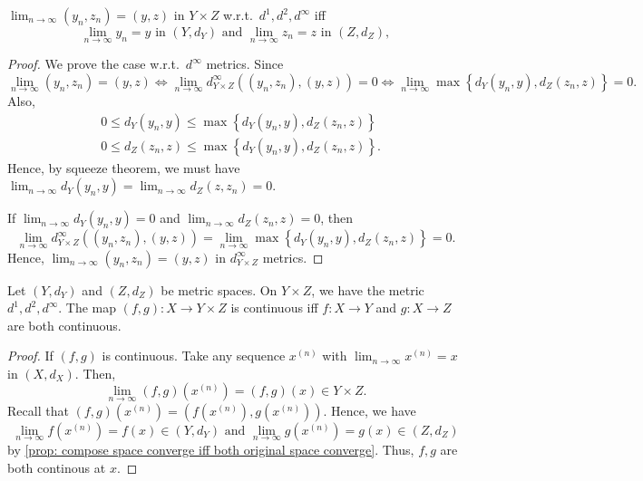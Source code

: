 \begin{proposition} \label{prop: compose space converge iff both original space converge}
    \(\lim_{n \to \infty} (y_n, z_n) = (y, z) \) in \(Y \times Z\) w.r.t.\ \(d^1, d^2, d^{\infty} \) iff 
    \[
        \lim_{n \to \infty} y_n = y \text{ in } (Y, d_Y) \text{ and } \lim_{n \to \infty} z_n = z \text{ in } (Z, d_Z),  
    \]   
\end{proposition}
\begin{proof}
    We prove the case w.r.t.\ \(d^{\infty} \) metrics. Since 
    \[
        \lim_{n \to \infty} (y_n, z_n) = (y, z) \iff  \lim_{n \to \infty} d_{Y \times Z}^{\infty} \left( (y_n, z_n), (y, z) \right) = 0 \iff \lim_{n \to \infty} \max \left\{ d_Y(y_n, y), d_Z(z_n, z) \right\} = 0.     
    \] Also, 
    \begin{align*}
        &0 \le d_Y(y_n, y) \le \max \left\{ d_Y(y_n, y), d_Z(z_n, z) \right\} \\
        &0 \le d_Z(z_n, z) \le \max \left\{ d_Y(y_n, y), d_Z(z_n, z) \right\}. 
    \end{align*}
    Hence, by squeeze theorem, we must have \(\lim_{n \to \infty} d_Y(y_n, y) = \lim_{n \to \infty} d_Z(z, z_n)=0  \). 
    
    If \(\lim_{n \to \infty} d_Y (y_n, y) = 0 \) and \(\lim_{n \to \infty} d_Z(z_n, z) = 0 \), then 
    \[
        \lim_{n \to \infty} d_{Y \times Z}^{\infty} \left( (y_n, z_n), (y, z) \right) = \lim_{n \to \infty} \max \left\{ d_Y(y_n, y), d_Z(z_n, z) \right\} = 0.  
    \]  
    Hence, \(\lim_{n \to \infty} (y_n, z_n) = (y, z) \) in \(d_{Y \times Z}^{\infty} \) metrics.  
\end{proof}

\begin{theorem} \label{thm: f compose g conti if f and g both conti}
    Let \((Y, d_Y)\) and \((Z, d_Z)\) be metric spaces. On \(Y \times Z\), we have the metric \(d^1, d^2, d^{\infty} \). The map \((f, g): X \to Y \times Z\) is continuous iff \(f: X \to Y\) and \(g: X \to Z\) are both continuous.       
\end{theorem}
\begin{proof}
    If \((f, g)\) is continuous. Take any sequence \(x^{(n)}\) with \(\lim_{n \to \infty} x^{(n)} = x \) in \((X, d_X)\). Then, 
    \[
        \lim_{n \to \infty} \left( f ,g \right)\left( x^{(n)} \right) = \left( f ,g \right)(x) \in Y \times Z.    
    \] Recall that \(\left( f, g \right) \left( x^{(n)} \right) = \left( f \left( x^{(n)} \right), g \left( x^{(n)} \right)   \right)   \). Hence, we have 
    \[
        \lim_{n \to \infty} f \left( x^{(n)} \right) = f(x) \in \left( Y, d_Y \right)  \text{ and } \lim_{n \to \infty} g \left( x^{(n)} \right) = g(x) \in (Z, d_Z)
    \] by \autoref{prop: compose space converge iff both original space converge}. Thus, \(f, g\) are both continous at \(x\).  
\end{proof}

